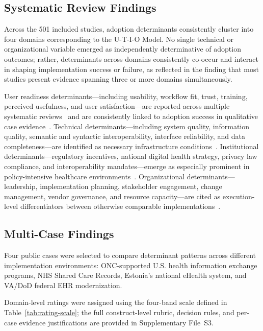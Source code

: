 \subsection{Systematic Review Findings}
Across the 501 included studies, adoption determinants consistently cluster into four domains corresponding to the U-T-I-O Model. No single technical or organizational variable emerged as independently determinative of adoption outcomes; rather, determinants across domains consistently co-occur and interact in shaping implementation success or failure, as reflected in the finding that most studies present evidence spanning three or more domains simultaneously.

User readiness determinants—including usability, workflow fit, trust, training, perceived usefulness, and user satisfaction—are reported across multiple systematic reviews~\cite{kruse2016adoption,alshahrani2019ehealth,aguirre2019ehr} and are consistently linked to adoption success in qualitative case evidence~\cite{adams2020strategies}. Technical determinants—including system quality, information quality, semantic and syntactic interoperability, interface reliability, and data completeness—are identified as necessary infrastructure conditions~\cite{kamuhanda2026interoperability,kruse2016barriers}. Institutional determinants—regulatory incentives, national digital health strategy, privacy law compliance, and interoperability mandates—emerge as especially prominent in policy-intensive healthcare environments~\cite{ross2016factors,akhlaq2016hie,onc2025reports}. Organizational determinants—leadership, implementation planning, stakeholder engagement, change management, vendor governance, and resource capacity—are cited as execution-level differentiators between otherwise comparable implementations~\cite{ahmed2019reviews,gao2025vaehr,gao2024dodehr}.

\subsection{Multi-Case Findings}
Four public cases were selected to compare determinant patterns across different implementation environments: ONC-supported U.S. health information exchange programs, NHS Shared Care Records, Estonia's national eHealth system, and VA/DoD federal EHR modernization.

Domain-level ratings were assigned using the four-band scale defined in Table~\ref{tab:rating-scale}; the full construct-level rubric, decision rules, and per-case evidence justifications are provided in Supplementary File~S3.


